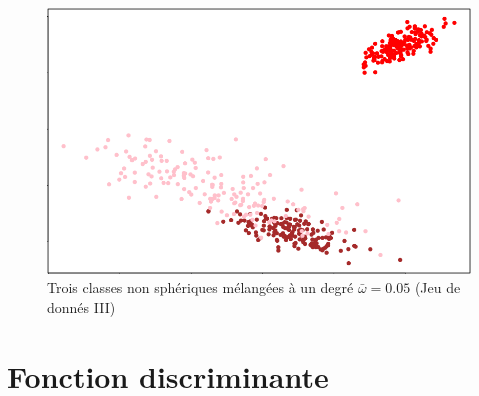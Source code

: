 \begin{itemize}
	\begin{figure}[H]
		\centering
		\includegraphics[width=0.5\linewidth]{images/non_spherical_classes_mixed.png}
		\caption{Trois classes non sphériques mélangées à un degré $\bar{\omega} = 0.05$ (Jeu de donnés III)}
	\end{figure}
\end{itemize}

\section{Fonction discriminante}
